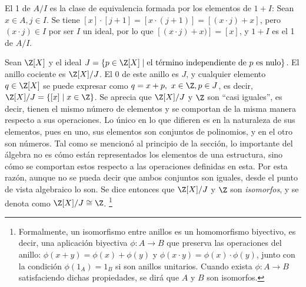 \begin{TFGampliado}
        \item El 1 de  $A/I$ es la clase de equivalencia formada por los elementos de $1 + I$:
            Sean $x\in A, j\in I$. Se tiene $[x] \cdot [j + 1] = [x \cdot(j+1)] = [(x\cdot j) + x]$, pero $(x\cdot j) \in I$ por ser $I$ un ideal, por lo que $[(x\cdot j) + x)]=  [x]$, y $1 + I$ es el 1 de $A/I$.
            
        \item Sean $\Z[X]$ y el ideal $J = \{p\in \Z[X] \mid \text{el término independiente de $p$ es nulo}\}$. El anillo cociente es $\Z[X]/J$. El 0 de este anillo es $J$, y cualquier elemento $q\in \Z[X]$ se puede expresar como $q = x + p,\ x\in \Z, p\in J$, es decir, $\Z[X]/J = \{[x] \mid x\in \Z\}$. Se aprecia que $\Z[X]/J$ y $\Z$ son ``casi iguales'', es decir, tienen el mismo número de elementos y se comportan de la misma manera respecto a sus operaciones. Lo único en lo que difieren es en la naturaleza de sus elementos, pues en uno, sus elementos son conjuntos de polinomios, y en el otro son números. Tal como se mencionó al principio de la sección, lo importante del álgebra no es cómo están representados los elementos de una estructura, sino cómo se comportan estos respecto a las operaciones definidas en esta. Por esta razón, aunque no se pueda decir que ambos conjuntos son iguales, desde el punto de vista algebraico lo son. Se dice entonces que $\Z[X]/J$ y $\Z$ son \textit{isomorfos}, y se denota como $\Z[X]/J \cong \Z$.
        \footnote{Formalmente, un isomorfismo entre anillos es un homomorfismo biyectivo, es decir, una aplicación biyectiva $\phi: A \to B$ que preserva las operaciones del anillo: $\phi (x + y) = \phi (x) + \phi(y)$ y $ \phi (x \cdot y) = \phi (x) \cdot \phi(y)$, junto con la condición $\phi (1_A) = 1_B$ si son anillos unitarios. Cuando exista $\phi: A \to B$ satisfaciendo dichas propiedades, se dirá que $A$ y $B$ son isomorfos.}
    \end{TFGampliado} 


